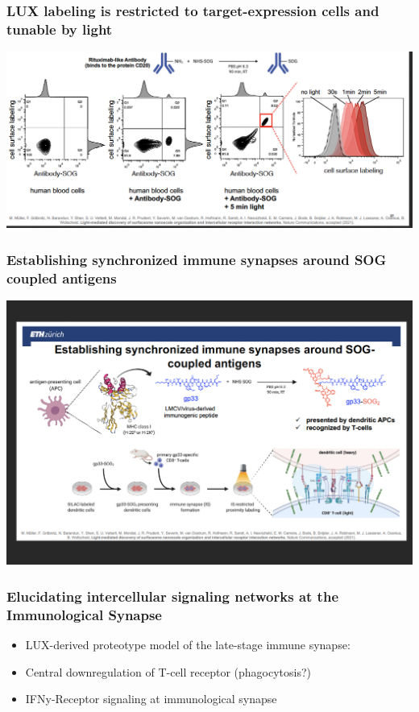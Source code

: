 \begin{itemize}
\begin{itemize}
\subsubsection{LUX labeling is restricted to target-expression cells and tunable by light}
\includegraphics[width=1\textwidth]{Images/Labeling.png}\\[1cm]

\subsubsection{Establishing synchronized immune synapses around SOG coupled
antigens}
\includegraphics[width=1\textwidth]{Images/Synchro.png}\\[1cm]

\subsubsection{Elucidating intercellular signaling networks at the
Immunological Synapse}
\begin{itemize}
    \item LUX-derived proteotype model of the late-stage immune synapse:
\item Central downregulation of T-cell receptor (phagocytosis?)
\item IFNy-Receptor signaling at immunological synapse
\end{itemize}

\end{itemize}
\end{itemize}
